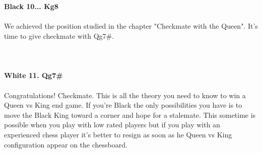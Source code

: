 \documentclass{article}
\begin{document}
\\
\\
\textbf{Black 10... Kg8}\\
\\
We achieved the position studied in the chapter "Checkmate with the Queen". It's time to give checkmate with Qg7\#.\\
\\

\\
\\
\textbf{White 11. Qg7\#}\\
\\
Congratulations! Checkmate. This is all the theory you need to know to win a Queen vs King end game. If you're Black the only possibilities you have is to move the Black King toward a corner and hope for a stalemate. This sometime is possible when you play with low rated players but if you play with an experienced chess player it's better to resign as soon as he Queen vs King configuration appear on the chessboard.
\end{document}
